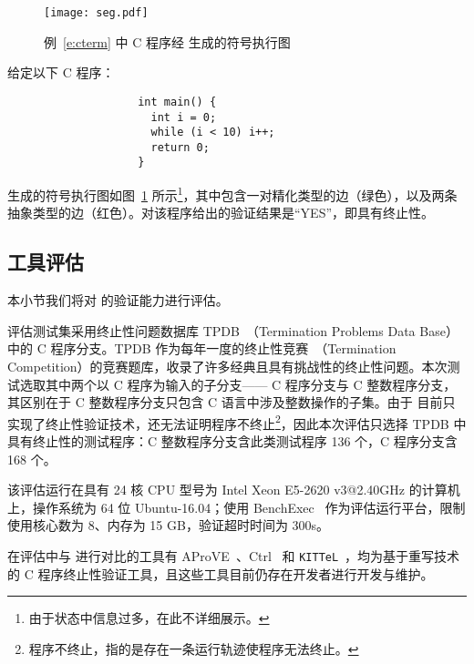 \begin{figure}[htbp] 
\centering
\texttt{[image: seg.pdf]}
\caption{例~\ref{e:cterm} 中 C 程序经 \CTerm 生成的符号执行图}
\label{f:seg}
\end{figure}

\begin{example}
\label{e:cterm}
给定以下 C 程序：
\begin{verbatim}
                    int main() {
                      int i = 0;
                      while (i < 10) i++;
                      return 0;
                    }
\end{verbatim}
\CTerm 生成的符号执行图如图~\ref{f:seg} 所示\footnote{由于状态中信息过多，在此不详细展示。}，其中包含一对精化类型的边（绿色），以及两条抽象类型的边（红色）。\CTerm 对该程序给出的验证结果是“YES”，即具有终止性。
\end{example}

\subsection{工具评估} 

本小节我们将对 \CTerm 的验证能力进行评估。

评估测试集采用终止性问题数据库 TPDB~\cite{tpdb}（Termination Problems Data Base）中的 C 程序分支。TPDB 作为每年一度的终止性竞赛~\cite{term-competition}（Termination Competition）的竞赛题库，收录了许多经典且具有挑战性的终止性问题。本次测试选取其中两个以 C 程序为输入的子分支—— C 程序分支与 C 整数程序分支，其区别在于 C 整数程序分支只包含 C 语言中涉及整数操作的子集。由于 \CTerm 目前只实现了终止性验证技术，还无法证明程序不终止\footnote{程序不终止，指的是存在一条运行轨迹使程序无法终止。}，因此本次评估只选择 TPDB 中具有终止性的测试程序：C 整数程序分支含此类测试程序 136 个，C 程序分支含 168 个。

该评估运行在具有 24 核 CPU 型号为 Intel Xeon E5-2620 v3@2.40GHz 的计算机上，操作系统为 64 位 Ubuntu-16.04；使用 BenchExec~\cite{DBLP:conf/tacas/Beyer16} 作为评估运行平台，限制使用核心数为 8、内存为 15 GB，验证超时时间为 300s。

在评估中与 \CTerm 进行对比的工具有 AProVE~\cite{DBLP:conf/rta/GieslTSF04,DBLP:conf/cade/GieslBEFFOPSSST14}、Ctrl~\cite{DBLP:conf/lpar/Kop015} 和 \verb|KITTeL|~\cite{DBLP:conf/rta/FalkeKS11}，均为基于重写技术的 C 程序终止性验证工具，且这些工具目前仍存在开发者进行开发与维护。 

